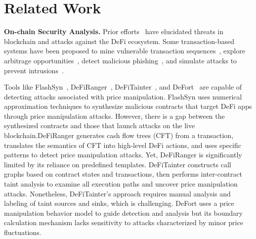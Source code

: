 \section{Related Work}
\label{sec:related}

\noindent
\textbf{On-chain Security Analysis.}
Prior efforts~\cite{zhou2021high, qin2021attacking, qin2022quantifying, daian2020flash, zhou2023sok} have elucidated threats in blockchain and attacks against the DeFi ecosystem. Some transaction-based systems have been proposed to mine vulnerable transaction sequences~\cite{zhang2020txspector, so2021smartest}, explore arbitrage opportunities~\cite{zhou2021just}, detect malicious phishing~\cite{he2023txphishscope}, and simulate attacks to prevent intrusions~\cite{qin2023blockchain}.

Tools like FlashSyn~\cite{chen2024flashsyn}, DeFiRanger~\cite{DeFiRanger23}, DeFiTainter~\cite{DeFiTainter23}, and DeFort~\cite{DeFort24} are capable of detecting attacks associated with price manipulation. FlashSyn uses numerical approximation techniques to synthesize malicious contracts that target DeFi apps through price manipulation attacks. However, there is a gap between the synthesized contracts and those that launch attacks on the live blockchain.DeFiRanger generates cash flow trees (CFT) from a transaction, translates the semantics of CFT into high-level DeFi actions, and uses specific patterns to detect price manipulation attacks. Yet, DeFiRanger is significantly limited by its reliance on predefined templates. DeFiTainter constructs call graphs based on contract states and transactions, then performs inter-contract taint analysis to examine all execution paths and uncover price manipulation attacks. Nonetheless, DeFiTainter's approach requires manual analysis and labeling of taint sources and sinks, which is challenging. DeFort uses a price manipulation behavior model to guide detection and analysis but its boundary calculation mechanism lacks sensitivity to attacks characterized by minor price fluctuations.

